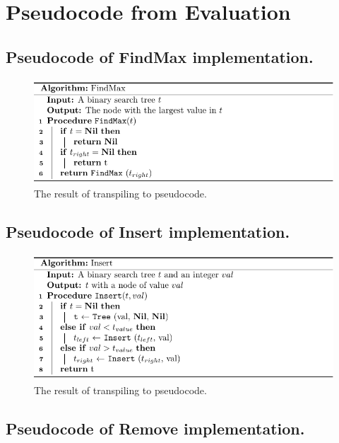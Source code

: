 \chapter{Pseudocode from Evaluation}
\label{appendixB}

\section{Pseudocode of FindMax implementation.}
\label{Pseudocode of FindMax implementation.}

\begin{figure}[!htb]
    \centering
    \includegraphics[scale=.8]{assets/chapter6/bst/FindMax_tbp.pdf}
    \caption{The result of transpiling  to pseudocode.}
    \label{findMaxTBP}
\end{figure}

\section{Pseudocode of Insert implementation.}
\label{Pseudocode of Insert implementation.}

\begin{figure}[!htb]
    \centering
    \includegraphics[scale=.8]{assets/chapter6/bst/Insert_tbp.pdf}
    \caption{The result of transpiling  to pseudocode.}
    \label{insertTBP}
\end{figure}

\newpage

\section{Pseudocode of Remove implementation.}
\label{Pseudocode of Remove implementation.}

